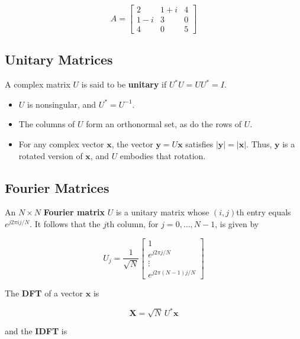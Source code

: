 \begin{equation*}
A =
\begin{bmatrix}
2 & 1+i & 4 \\
1-i & 3 & 0 \\
4 & 0 & 5
\end{bmatrix}
\end{equation*}

\subsection*{Unitary Matrices}

A complex matrix $U$ is said to be \textbf{unitary} if $U^* U = U U^* = I$.

\begin{itemize}
    \item $U$ is nonsingular, and $U^* = U^{-1}$.  
    \item The columns of $U$ form an orthonormal set, as do the rows of $U$.  
    \item For any complex vector $\mathbf{x}$, the vector $\mathbf{y} = U \mathbf{x}$ satisfies $|\mathbf{y}| = |\mathbf{x}|$.  
    Thus, $\mathbf{y}$ is a rotated version of $\mathbf{x}$, and $U$ embodies that rotation.
\end{itemize}

\subsection*{Fourier Matrices}

An $N \times N$ \textbf{Fourier matrix} $U$ is a unitary matrix whose $(i,j)$th entry equals $e^{j 2\pi i j / N}$.  
It follows that the $j$th column, for $j = 0, \ldots, N-1$, is given by

\begin{equation}
U_j = \frac{1}{\sqrt{N}}
\begin{bmatrix}
1 \\
e^{j 2\pi j / N} \\
\vdots \\
e^{j 2\pi (N-1) j / N}
\end{bmatrix}
\tag{B.7}
\end{equation}

The \textbf{DFT} of a vector $\mathbf{x}$ is

\begin{equation}
\mathbf{X} = \sqrt{N} \, U^* \mathbf{x}
\tag{B.8}
\end{equation}

and the \textbf{IDFT} is

